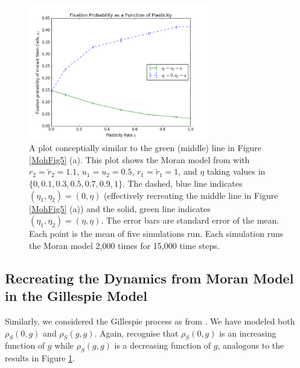 \documentclass[12pt]{article}
\begin{document}
\begin{figure}[H]
\begin{center}
\includegraphics[width=0.7\textwidth]{moh_both.png}
\end{center}
\caption{A plot conceptially similar to the green (middle) line in Figure \ref{MohFig5} (a). This plot shows the Moran model from \cite{mohammad} with $r_2=\tilde{r}_2=1.1$, $u_1=u_2=0.5$, $r_1=\tilde{r}_1=1$, and $\eta$ taking values in $\{0, 0.1, 0.3, 0.5, 0.7, 0.9, 1\}$. The dashed, blue line indicates $(\eta_1, \eta_2)=(0,\eta)$ (effectively recreating the middle line in Figure \ref{MohFig5} (a)) and the solid, green line indicates $(\eta_1, \eta_2)=(\eta, \eta)$. The error bars are standard error of the mean. Each point is the mean of five simulations run. Each simulation runs the Moran model 2,000 times for 15,000 time steps. }\label{mohBothInc}
\end{figure}

\subsection{Recreating the Dynamics from Moran Model in the Gillespie Model}
Similarly, we considered the Gillespie process as from \cite{gillespie}. We have modeled both $\rho_S(0, g)$ and $\rho_S(g, g)$. Again, recognise that $\rho_S(0, g)$ is an increasing function of $g$ while $\rho_S(g, g)$ is a decreasing function of $g$, analogous to the results in Figure \ref{mohBothInc}.
\end{document}
